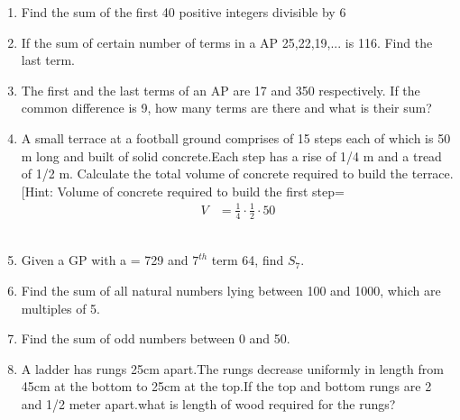 \begin{enumerate}[label=\thechapter.\arabic*,ref=\thechapter.\theenumi]
\pagebreak
\item Find the sum of the first 40 positive integers divisible by 6\\
	\solution
		
\pagebreak
\item If the sum of certain number of terms in a AP 25,22,19,... is 116. Find the last term.\\
\solution

\pagebreak

\item The first and the last terms of an AP are 17 and 350 respectively. If the common difference
is 9, how many terms are there and what is their sum?\\
\solution 

\pagebreak
\item A small terrace at a football ground comprises of 15 steps each of which is 50
m long and built of solid concrete.Each step has a rise of 1/4 m and a tread of
1/2 m. Calculate the total volume of concrete required to build the terrace.
[Hint: Volume of concrete required to build the first step=\begin{align}
    V&=\frac{1}{4} \cdot \frac{1}{2} \cdot 50 
\end{align}\\
\solution 

\pagebreak

\item Given a GP with a = 729 and $7^{th}$ term 64, find $S_7$.\\
\solution 

\pagebreak

\item Find the sum of all natural numbers lying between 100 and 1000, which are
multiples of 5.\\
\solution

\pagebreak

\item Find the sum of odd numbers between 0 and 50.\\
\solution

\pagebreak

\item  A ladder has rungs 25cm apart.The rungs decrease uniformly in length from 45cm at the bottom to 25cm at the top.If the top and bottom rungs are 2 and 1/2 meter apart.what is length of wood required for the rungs?\\
\solution

\pagebreak


\end{enumerate}

